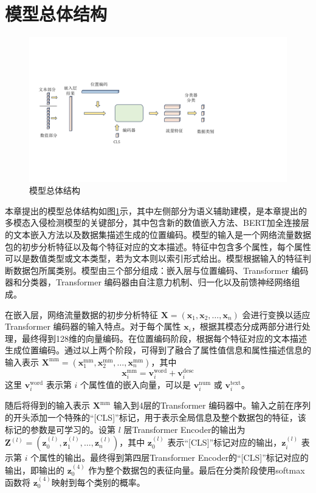 \section{模型总体结构}

\begin{figure}[htbp]
    \centering
    \includegraphics[width=1\linewidth]{img/multimodal/simple_overview.pdf}
    \caption{模型总体结构}
    \label{fig:simple_overview}
\end{figure}

本章提出的模型总体结构如图\ref{fig:simple_overview}示，其中左侧部分为语义辅助建模，是本章提出的多模态入侵检测模型的关键部分，其中包含新的数值嵌入方法、BERT加全连接层的文本嵌入方法以及数据集描述生成的位置编码。模型的输入是一个网络流量数据包的初步分析特征以及每个特征对应的文本描述。特征中包含多个属性，每个属性可以是数值类型或文本类型，若为文本则以索引形式给出。模型根据输入的特征判断数据包所属类别。模型由三个部分组成：嵌入层与位置编码、Transformer 编码器和分类器，Transformer 编码器由自注意力机制、归一化以及前馈神经网络组成。

在嵌入层，网络流量数据的初步分析特征 $\mathbf{X} = (\mathbf{x}_1, \mathbf{x}_2, \ldots, \mathbf{x}_n)$ 会进行变换以适应Transformer 编码器的输入特点。对于每个属性 $\mathbf{x}_i$，根据其模态分成两部分进行处理，最终得到128维的向量编码。在位置编码阶段，根据每个特征对应的文本描述生成位置编码。通过以上两个阶段，可得到了融合了属性值信息和属性描述信息的输入表示 $\mathbf{X}^{\mathrm{mm}} = (\mathbf{x}_1^{\mathrm{mm}}, \mathbf{x}_2^{\mathrm{mm}}, \ldots, \mathbf{x}_n^{\mathrm{mm}})$，其中
$$
\mathbf{x}_i^{\mathrm{mm}} = \mathbf{v}_i^{\mathrm{word}} + \mathbf{v}_i^{\mathrm{desc}}
$$
这里 $\mathbf{v}_i^{\mathrm{word}}$ 表示第 $i$ 个属性值的嵌入向量，可以是 $\mathbf{v}_i^{\mathrm{num}}$ 或 $\mathbf{v}_i^{\mathrm{text}}$。

随后将得到的输入表示 $\mathbf{X}^{\mathrm{mm}}$ 输入到4层的Transformer 编码器中。输入之前在序列的开头添加一个特殊的“[CLS]”标记，用于表示全局信息及整个数据包的特征，该标记的参数是可学习的。设第 $l$ 层Transformer Encoder的输出为 $\mathbf{Z}^{(l)} = (\mathbf{z}_0^{(l)}, \mathbf{z}_1^{(l)}, \ldots, \mathbf{z}_n^{(l)})$，其中 $\mathbf{z}_0^{(l)}$ 表示“[CLS]”标记对应的输出，$\mathbf{z}_i^{(l)}$ 表示第 $i$ 个属性的输出。最终得到第四层Transformer Encoder的“[CLS]”标记对应的输出，即输出的 $\mathbf{z}_0^{(4)}$ 作为整个数据包的表征向量。最后在分类阶段使用softmax函数将 $\mathbf{z}_0^{(4)}$映射到每个类别的概率。

